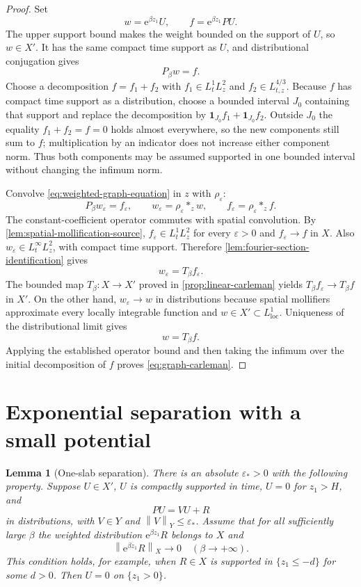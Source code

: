 \documentclass[11pt,oneside]{book}
\newtheorem{lemma}[theorem]{Lemma}
\theoremstyle{definition}
\theoremstyle{remark}
\newcommand{\1}{\mathbf 1}
\newcommand{\loc}{\mathrm{loc}}
\newcommand{\norm}[1]{\left\lVert #1\right\rVert}
\newcommand{\e}{\mathrm e}
\newcommand{\eps}{\varepsilon}
\begin{document}
\begin{proof}
Set
\[
 w=\e^{\beta z_1}U,
 \qquad f=\e^{\beta z_1}PU.
\]
The upper support bound makes the weight bounded on the support of $U$, so
$w\in X'$.  It has the same compact time support as $U$, and distributional
conjugation gives
\[
 P_\beta w=f.                                      \label{eq:weighted-graph-equation}
\]
Choose a decomposition $f=f_1+f_2$ with
$f_1\in L^1_tL^2_z$ and $f_2\in L^{4/3}_{t,z}$.  Because $f$ has compact
time support as a distribution, choose a bounded interval $J_0$ containing
that support and replace the decomposition by
$\1_{J_0}f_1+\1_{J_0}f_2$.  Outside $J_0$ the equality
$f_1+f_2=f=0$ holds almost everywhere, so the new components still sum to
$f$; multiplication by an indicator does not increase either component norm.
Thus both components may be assumed supported in one bounded interval without
changing the infimum norm.

Convolve \eqref{eq:weighted-graph-equation} in $z$ with $\rho_\eps$:
\[
 P_\beta w_\eps=f_\eps,
 \qquad
 w_\eps=\rho_\eps*_zw,
 \qquad f_\eps=\rho_\eps*_zf.
\]
The constant-coefficient operator commutes with spatial convolution.
By \cref{lem:spatial-mollification-source},
$f_\eps\in L^1_tL^2_z$ for every $\eps>0$ and
$f_\eps\to f$ in $X$.  Also $w_\eps\in L^\infty_tL^2_z$, with compact time
support.  Therefore \cref{lem:fourier-section-identification} gives
\[
 w_\eps=T_\beta f_\eps.
\]
The bounded map $T_\beta:X\to X'$ proved in
\cref{prop:linear-carleman} yields
$T_\beta f_\eps\to T_\beta f$ in $X'$.  On the other hand,
$w_\eps\to w$ in distributions because spatial mollifiers approximate every
locally integrable function and $w\in X'\subset L^1_{\loc}$.  Uniqueness of
the distributional limit gives
\[
 w=T_\beta f.
\]
Applying the established operator bound and then taking the infimum over the
initial decomposition of $f$ proves \eqref{eq:graph-carleman}.
\end{proof}

\section{Exponential separation with a small potential}

\begin{lemma}[One-slab separation]\label{lem:one-slab}
There is an absolute $\eps_*>0$ with the following property.  Suppose
$U\in X'$, $U$ is compactly supported in time, $U=0$ for $z_1>H$, and
\begin{equation}
  PU=VU+R                                             \label{eq:one-slab-eq}
\end{equation}
in distributions, with $V\in Y$ and $\norm V_Y\le\eps_*$.  Assume that for
all sufficiently large $\beta$ the weighted distribution
$\e^{\beta z_1}R$ belongs to $X$ and
\begin{equation}
 \norm{\e^{\beta z_1}R}_X\longrightarrow0
 \quad(\beta\to+\infty).                            \label{eq:R-decay}
\end{equation}
This condition holds, for example, when $R\in X$ is supported in
$\{z_1\le-d\}$ for some $d>0$.  Then $U=0$ on $\{z_1>0\}$.
\end{lemma}
\end{document}
